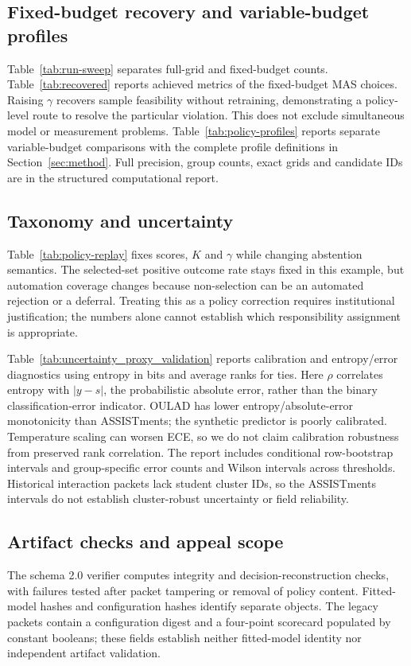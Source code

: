 \subsection{Fixed-budget recovery and variable-budget profiles}
Table~\ref{tab:run-sweep} separates full-grid and fixed-budget counts. Table~\ref{tab:recovered} reports achieved metrics of the fixed-budget MAS choices. Raising $\gamma$ recovers sample feasibility without retraining, demonstrating a policy-level route to resolve the particular violation. This does not exclude simultaneous model or measurement problems. Table~\ref{tab:policy-profiles} reports separate variable-budget comparisons with the complete profile definitions in Section~\ref{sec:method}. Full precision, group counts, exact grids and candidate IDs are in the structured computational report.




\subsection{Taxonomy and uncertainty}
Table~\ref{tab:policy-replay} fixes scores, $K$ and $\gamma$ while changing abstention semantics. The selected-set positive outcome rate stays fixed in this example, but automation coverage changes because non-selection can be an automated rejection or a deferral. Treating this as a policy correction requires institutional justification; the numbers alone cannot establish which responsibility assignment is appropriate.


Table~\ref{tab:uncertainty_proxy_validation} reports calibration and entropy/error diagnostics using entropy in bits and average ranks for ties. Here $\rho$ correlates entropy with $|y-s|$, the probabilistic absolute error, rather than the binary classification-error indicator. OULAD has lower entropy/absolute-error monotonicity than ASSISTments; the synthetic predictor is poorly calibrated. Temperature scaling can worsen ECE, so we do not claim calibration robustness from preserved rank correlation. The report includes conditional row-bootstrap intervals and group-specific error counts and Wilson intervals across thresholds. Historical interaction packets lack student cluster IDs, so the ASSISTments intervals do not establish cluster-robust uncertainty or field reliability.


\subsection{Artifact checks and appeal scope}
The schema 2.0 verifier computes integrity and decision-reconstruction checks, with failures tested after packet tampering or removal of policy content. Fitted-model hashes and configuration hashes identify separate objects. The legacy packets contain a configuration digest and a four-point scorecard populated by constant booleans; these fields establish neither fitted-model identity nor independent artifact validation.

